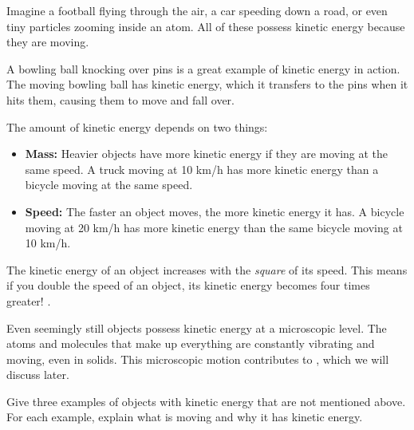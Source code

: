 
Imagine a football flying through the air, a car speeding down a road, or even tiny particles zooming inside an atom.  All of these possess kinetic energy because they are moving.

\begin{example}
A bowling ball knocking over pins is a great example of kinetic energy in action. The moving bowling ball has kinetic energy, which it transfers to the pins when it hits them, causing them to move and fall over.
\end{example}

The amount of kinetic energy depends on two things:

\begin{itemize}
    \item \textbf{Mass:}  Heavier objects have more kinetic energy if they are moving at the same speed.  A truck moving at 10 km/h has more kinetic energy than a bicycle moving at the same speed.
    \item \textbf{Speed:} The faster an object moves, the more kinetic energy it has.  A bicycle moving at 20 km/h has more kinetic energy than the same bicycle moving at 10 km/h.
\end{itemize}

\begin{marginnote}
The kinetic energy of an object increases with the \textit{square} of its speed.  This means if you double the speed of an object, its kinetic energy becomes four times greater!  .
\end{marginnote}

Even seemingly still objects possess kinetic energy at a microscopic level. The atoms and molecules that make up everything are constantly vibrating and moving, even in solids. This microscopic motion contributes to , which we will discuss later.

\begin{stopandthink}
Give three examples of objects with kinetic energy that are not mentioned above. For each example, explain what is moving and why it has kinetic energy.
\end{stopandthink}

